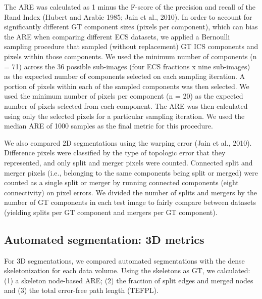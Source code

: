 \documentclass{article}
\begin{document}
The ARE was calculated as 1 minus the F-score of the precision and recall of the Rand Index (Hubert and Arabie 1985; Jain et al., 2010). In order to account for significantly different GT component sizes (pixels per component), which can bias the ARE when comparing different ECS datasets, we applied a Bernoulli sampling procedure that sampled (without replacement) GT ICS components and pixels within those components. We used the minimum number of components (n = 71) across the 36 possible sub-images (four ECS fractions x nine sub-images) as the expected number of components selected on each sampling iteration. A portion of pixels within each of the sampled components was then selected. We used the minimum number of pixels per component (n = 20) as the expected number of pixels selected from each component. The ARE was then calculated using only the selected pixels for a particular sampling iteration. We used the median ARE of 1000 samples as the final metric for this procedure.

We also compared 2D segmentations using the warping error (Jain et al., 2010). Difference pixels were classified by the type of topologic error that they represented, and only split and merger pixels were counted. Connected split and merger pixels (i.e., belonging to the same components being split or merged) were counted as a single split or merger by running connected components (eight connectivity) on pixel errors. We divided the number of splits and mergers by the number of GT components in each test image to fairly compare between datasets (yielding splits per GT component and mergers per GT component).

\subsection*{Automated segmentation: 3D metrics}

For 3D segmentations, we compared automated segmentations with the dense skeletonization for each data volume. Using the skeletons as GT, we calculated: (1) a skeleton node-based ARE; (2) the fraction of split edges and merged nodes and (3) the total error-free path length (TEFPL).
\end{document}
